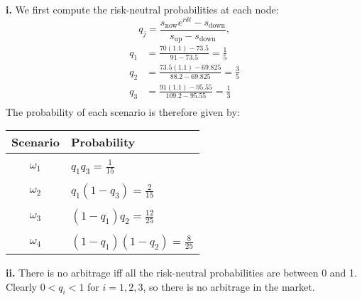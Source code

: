 \documentclass[11pt]{article}
\begin{document}
	\noindent \textbf{i. } We first compute the risk-neutral probabilities at each node:
	\[	q_{j} = \frac{s_{\text{now}}e^{r\delta t} - s_{\text{down}}}{s_{\text{up}} - s_{\text{down}}},
		\]
	\begin{align*}
		q_{1} & = \frac{70(1.1) - 73.5}{91 - 73.5} = \frac{1}{5} \\[5pt]
		q_{2} & = \frac{73.5(1.1) - 69.825}{88.2 - 69.825} = \frac{3}{5}\\[5pt]
		q_{3} & = \frac{91(1.1) - 95.55}{109.2 - 95.55} = \frac{1}{3}\\
	\end{align*}
	The probability of each scenario is therefore given by:
	\begin{center}
		\begin{tabular}{cl}
			\textbf{Scenario} & \textbf{Probability}\\[5pt]
			\hline
			\hline
			&\\[-2ex]
			$\omega_{1}$ & $\displaystyle q_{1}q_{3} = \frac{1}{15}$\\[5pt]
			\hline
			&\\[-2ex]
			$\omega_{2}$ & $\displaystyle q_{1}(1-q_{3}) = \frac{2}{15}$\\[5pt]
			\hline
			&\\[-2ex]
			$\omega_{3}$ & $\displaystyle (1-q_{1})q_{2} = \frac{12}{25}$\\[5pt]
			\hline
			&\\[-2ex]
			$\omega_{4}$ & $\displaystyle (1-q_{1})(1-q_{2}) = \frac{8}{25}$\\[5pt]
			\hline
			\end{tabular}
		\end{center}
	\newpage
	\noindent \textbf{ii. } There is no arbitrage iff all the risk-neutral probabilities are between 0 and 1. 
	Clearly $0<q_{i}<1$ for $i=1,2,3$, so there is no arbitrage in the market. \\\\
	
\end{document}

